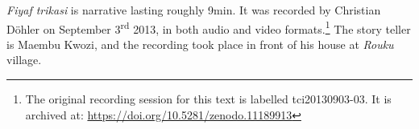 \textit{Fiyaf trikasi} is narrative lasting roughly 9min. It was recorded by Christian Döhler on September 3\textsuperscript{rd} 2013, in both audio and video formats.\footnote{The original recording session for this text is labelled tci20130903-03. It is archived at: \href{https://doi.org/10.5281/zenodo.11189913}{https://doi.org/10.5281/zenodo.11189913}} The story teller is Maembu Kwozi, and the recording took place in front of his house at \textit{Rouku} village.